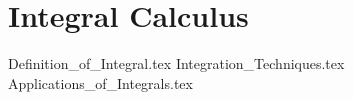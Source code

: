 \section{Integral Calculus}

{Definition_of_Integral.tex}
{Integration_Techniques.tex}
{Applications_of_Integrals.tex}